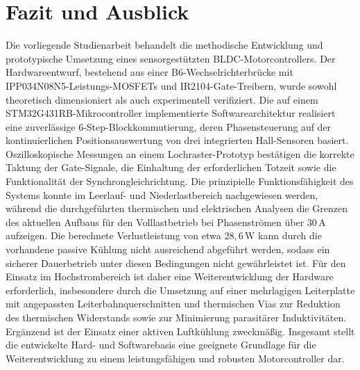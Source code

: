 \chapter{Fazit und Ausblick}
\label{chap:fazit}

Die vorliegende Studienarbeit behandelt die methodische Entwicklung und prototypische Umsetzung eines sensorgestützten BLDC-Motorcontrollers. Der Hardwareentwurf, bestehend aus einer B6-Wechselrichterbrücke mit IPP034N08N5-Leistungs-MOSFETs und IR2104-Gate-Treibern, wurde sowohl theoretisch dimensioniert als auch experimentell verifiziert. Die auf einem STM32G431RB-Mikrocontroller implementierte Softwarearchitektur realisiert eine zuverlässige 6-Step-Blockkommutierung, deren Phasensteuerung auf der kontinuierlichen Positionsauswertung von drei integrierten Hall-Sensoren basiert. Oszilloskopische Messungen an einem Lochraster-Prototyp bestätigen die korrekte Taktung der Gate-Signale, die Einhaltung der erforderlichen Totzeit sowie die Funktionalität der Synchrongleichrichtung. Die prinzipielle Funktionsfähigkeit des Systems konnte im Leerlauf- und Niederlastbereich nachgewiesen werden, während die durchgeführten thermischen und elektrischen Analysen die Grenzen des aktuellen Aufbaus für den Volllastbetrieb bei Phasenströmen über $30\,\mathrm{A}$ aufzeigen. Die berechnete Verlustleistung von etwa $28{,}6\,\mathrm{W}$ kann durch die vorhandene passive Kühlung nicht ausreichend abgeführt werden, sodass ein sicherer Dauerbetrieb unter diesen Bedingungen nicht gewährleistet ist. Für den Einsatz im Hochstrombereich ist daher eine Weiterentwicklung der Hardware erforderlich, insbesondere durch die Umsetzung auf einer mehrlagigen Leiterplatte mit angepassten Leiterbahnquerschnitten und thermischen Vias zur Reduktion des thermischen Widerstands sowie zur Minimierung parasitärer Induktivitäten. Ergänzend ist der Einsatz einer aktiven Luftkühlung zweckmäßig. Insgesamt stellt die entwickelte Hard- und Softwarebasis eine geeignete Grundlage für die Weiterentwicklung zu einem leistungsfähigen und robusten Motorcontroller dar.